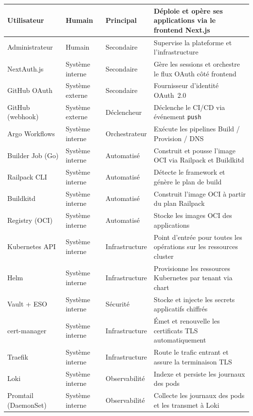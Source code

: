 \begin{longtable}{|p{3.2cm}|p{2.2cm}|p{2.2cm}|p{5.5cm}|}
Utilisateur & Humain & Principal & Déploie et opère ses applications via le frontend Next.js \\
\hline
Administrateur & Humain & Secondaire & Supervise la plateforme et l'infrastructure \\
\hline
NextAuth.js & Système interne & Secondaire & Gère les sessions et orchestre le flux OAuth côté frontend \\
\hline
GitHub OAuth & Système externe & Secondaire & Fournisseur d'identité OAuth~2.0 \\
\hline
GitHub (webhook) & Système externe & Déclencheur & Déclenche le CI/CD via événement \texttt{push} \\
\hline
Argo Workflows & Système interne & Orchestrateur & Exécute les pipelines Build / Provision / DNS \\
\hline
Builder Job (Go) & Système interne & Automatisé & Construit et pousse l'image OCI via Railpack et Buildkitd \\
\hline
Railpack CLI & Système interne & Automatisé & Détecte le framework et génère le plan de build \\
\hline
Buildkitd & Système interne & Automatisé & Construit l'image OCI à partir du plan Railpack \\
\hline
Registry (OCI) & Système interne & Automatisé & Stocke les images OCI des applications \\
\hline
Kubernetes API & Système interne & Infrastructure & Point d'entrée pour toutes les opérations sur les ressources cluster \\
\hline
Helm & Système interne & Infrastructure & Provisionne les ressources Kubernetes par tenant via chart \\
\hline
Vault + ESO & Système interne & Sécurité & Stocke et injecte les secrets applicatifs chiffrés \\
\hline
cert-manager & Système interne & Infrastructure & Émet et renouvelle les certificats TLS automatiquement \\
\hline
Traefik & Système interne & Infrastructure & Route le trafic entrant et assure la terminaison TLS \\
\hline
Loki & Système interne & Observabilité & Indexe et persiste les journaux des pods \\
\hline
Promtail (DaemonSet) & Système interne & Observabilité & Collecte les journaux des pods et les transmet à Loki \\
\hline

\end{longtable}
